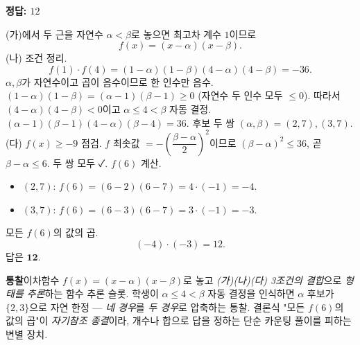 \documentclass[10pt]{article}
\newcommand{\solnote}[1]{\par\smallskip\noindent
  \begin{tcolorbox}[enhanced, breakable, colback=vB-light, colframe=vB-light,
    boxrule=0pt, arc=3pt, left=10pt, right=10pt, top=4pt, bottom=4pt,
    fontupper=\sffamily\footnotesize\color{vB-ink}]
    \textbf{\color{vB-deep}통찰}\quad #1
  \end{tcolorbox}}
\begin{document}
\begin{answerbox}\sffamily\bfseries 정답: $12$\end{answerbox}
 (가)에서 두 근을 자연수 $\alpha < \beta$로 놓으면 최고차 계수 $1$이므로
\[ f(x) = (x - \alpha)(x - \beta). \]
 (나) 조건 정리.
\[ f(1) \cdot f(4) = (1 - \alpha)(1 - \beta)(4 - \alpha)(4 - \beta) = -36. \]
$\alpha, \beta$가 자연수이고 곱이 음수이므로 한 인수만 음수. $(1-\alpha)(1-\beta) = (\alpha - 1)(\beta - 1) \ge 0$ (자연수 두 인수 모두 $\le 0$). 따라서 $(4 - \alpha)(4 - \beta) < 0$이고 \emph{$\alpha \le 4 < \beta$} 자동 결정.
 $(\alpha - 1)(\beta - 1)(4 - \alpha)(\beta - 4) = 36$.
 후보 두 쌍 $(\alpha, \beta) = (2, 7), (3, 7)$.
 (다) $f(x) \ge -9$ 점검. $f$ 최솟값 $= -\left(\dfrac{\beta - \alpha}{2}\right)^2$이므로 $(\beta - \alpha)^2 \le 36$, 곧 $\beta - \alpha \le 6$. 두 쌍 모두 ✓.
 $f(6)$ 계산.
\begin{itemize}\setlength{\itemsep}{0pt}
\item $(2, 7)$: $f(6) = (6 - 2)(6 - 7) = 4 \cdot (-1) = -4$.
\item $(3, 7)$: $f(6) = (6 - 3)(6 - 7) = 3 \cdot (-1) = -3$.
\end{itemize}
 모든 $f(6)$의 값의 곱.
\[ (-4) \cdot (-3) = 12. \]
답은 $\textbf{12}$.
\solnote{이차함수 $f(x) = (x - \alpha)(x - \beta)$로 놓고 \emph{(가)(나)(다) 3조건의 결합}으로 \emph{형태를 추론}하는 함수 추론 슬롯. 학생이 \emph{$\alpha \le 4 < \beta$} 자동 결정을 인식하면 $\alpha$ 후보가 \emph{$\{2, 3\}$}으로 자연 한정 — \emph{네 경우}를 \emph{두 경우}로 압축하는 통찰. 결론식 "모든 $f(6)$의 값의 곱"이 \emph{자기참조 종결}이라, 개수나 합으로 답을 정하는 단순 카운팅 풀이를 피하는 변별 장치.}
\end{document}

